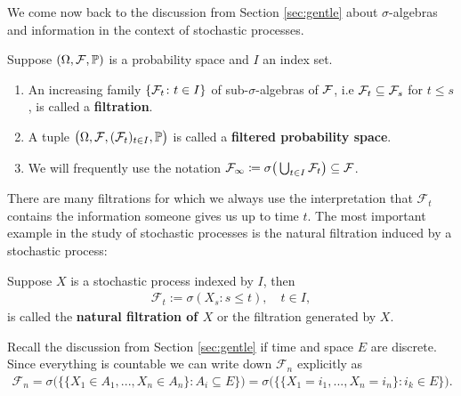 We come now back to the discussion from Section \ref{sec:gentle} about $\sigma$-algebras and information in the context of stochastic processes.
\begin{ldef}
\begin{deff}
	Suppose $(\Omega, \mathcal F,\P)$ is a probability space and $I$ an index set.
	\begin{enumerate}[label=(\roman*)]
	\item An increasing family $\lbrace \cF_t \colon t \in I \rbrace $ of sub-$\sigma$-algebras of $\cF$, i.e $\cF_t \subseteq \cF_s$ for $t \leq s$, is called a \textbf{filtration}. 
	\item A tuple $\big(\Omega,\cF,(\cF_t)_{t \in I},\mathbb{P}\big)$ is called a \textbf{filtered probability space}.
	\item We will frequently use the notation $\cF_{\infty}\coloneqq \sigma\big( \bigcup_{t\in I}\cF_t\big)\subseteq \mathcal F$.
	\end{enumerate}
\end{deff}
\end{ldef}
There are many filtrations for which we always use the interpretation that $\mathcal F_t$ contains the information someone gives us up to time $t$. The most important example in the study of stochastic processes is the natural filtration induced by a stochastic process:
\begin{ldef}
\begin{deff}\label{ex_ch2_2}
	Suppose $X$ is a stochastic process indexed by $I$, then 
	\begin{align*}
		\mathcal F_t:=\sigma(X_s:s\leq t), \quad t\in I,
	\end{align*}
	is called the \textbf{natural filtration of $X$} or the filtration generated by $X$.
\end{deff}
\end{ldef}
Recall the discussion from Section \ref{sec:gentle} if time and space $E$ are discrete. Since everything is countable we can write down $\mathcal F_n$ explicitly as
		\begin{align*}
		\mathcal F_n
		=\sigma\big(\{ \{X_1 \in A_1, ..., X_n \in A_n \} : A_i\subseteq E \}\big)
		=\sigma\big(\{\{X_1=i_1,..., X_n=i_n\}: i_k\in E \}\big).
	\end{align*}	
